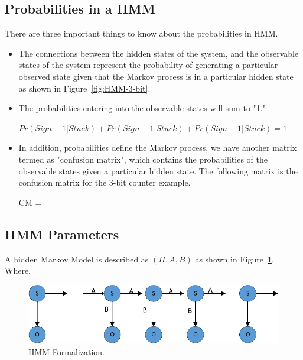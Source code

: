 \subsection{Probabilities in a HMM}

There are three important things to know about the probabilities in HMM.

\begin{itemize}
\item The connections between the hidden states of the system, and the observable states of the system represent the probability of generating a particular observed state given that the Markov process is in a particular hidden state as shown in Figure~\ref{fig:HMM-3-bit}.

\item The probabilities entering into the observable states will sum to "1." 

\begin{center}
$Pr(Sign-1|Stuck) + Pr(Sign-1|Stuck) + Pr(Sign-1|Stuck)  = 1 $
\end{center}

\item In addition, probabilities define the Markov process, we have another matrix termed as "confusion matrix", which contains the probabilities of the observable states given a particular hidden state. The following matrix is the confusion matrix for the 3-bit counter example.


\begin{center}


CM = 
\end{center}
\end{itemize}


\subsection{HMM Parameters}

A hidden Markov Model is described as $(\Pi, A, B)$ as shown in Figure~\ref{fig:MARKOV-SERIS}, Where,


\begin{figure}[tb!]

 \centering
  \captionsetup{justification=centering}    
   \includegraphics[scale=0.8]{Figures/MARKOV-SERIS.pdf}
   \caption{HMM Formalization.}
\label{fig:MARKOV-SERIS}
\end{figure}



